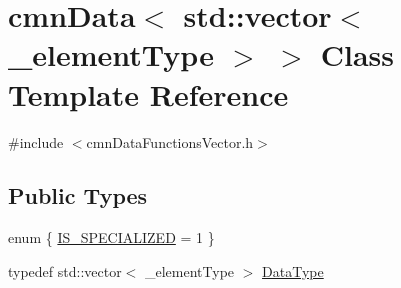 \hypertarget{classcmn_data_3_01std_1_1vector_3_01__element_type_01_4_01_4}{}\section{cmn\+Data$<$ std\+:\+:vector$<$ \+\_\+element\+Type $>$ $>$ Class Template Reference}
\label{classcmn_data_3_01std_1_1vector_3_01__element_type_01_4_01_4}


{\ttfamily \#include $<$cmn\+Data\+Functions\+Vector.\+h$>$}

\subsection*{Public Types}
\begin{DoxyCompactItemize}
\item 
enum \{ \hyperlink{classcmn_data_3_01std_1_1vector_3_01__element_type_01_4_01_4_ab0e90a24bd0f203a42883aad293d0152a612b4ed351eb8bd9c41c9a9da196fbe8}{I\+S\+\_\+\+S\+P\+E\+C\+I\+A\+L\+I\+Z\+E\+D} = 1
 \}
\item 
typedef std\+::vector$<$ \+\_\+element\+Type $>$ \hyperlink{classcmn_data_3_01std_1_1vector_3_01__element_type_01_4_01_4_a7a5332ebd12138b5f6d8b856cd3fdfd5}{Data\+Type}
\end{DoxyCompactItemize}

